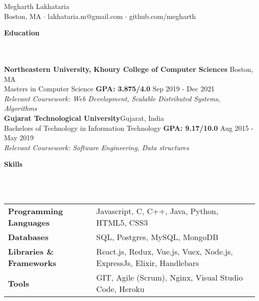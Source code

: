 \documentclass[]{article}
\newcommand{\lineunder} {
    \vspace*{-8pt} \\
    \hrulefill \\
}
\newcommand{\header} [1] {
    {\vspace*{6pt} \fontsize{12}{12}\selectfont \textbf{#1}}
     \lineunder
}
\begin{document}
\vspace*{-40pt}

    

\begin{center}
	{\LARGE {Megharth Lakhataria}}\\
	Boston, MA $\cdot$ lakhataria.m@gmail.com $\cdot$ github.com/megharth\\
\end{center}

\header{Education}
\hspace{1mm}
\textbf{Northeastern University, Khoury College of Computer Sciences}
\hfill
Boston, MA\\
\hspace{1mm}
Masters in Computer Science \textbf{GPA: 3.875/4.0} \hfill Sep 2019 - Dec 2021\\
\hspace{1mm}
\textit{Relevant Coursework: Web Development, Scalable Distributed Systems, Algorithms}\\
\vspace{1mm}
\hspace{1mm}
\textbf{Gujarat Technological University}\hfill Gujarat, India\\
\hspace{1mm}
Bachelors of Technology in Information Technology \textbf{GPA: 9.17/10.0}  \hfill Aug 2015 - May 2019 \\
\hspace{1mm}
\textit{Relevant Coursework: Software Engineering, Data structures} \\
\vspace{1mm}


\header{Skills}
\vspace{1mm}
\begin{tabular}{ l l }
	\textbf{Programming Languages} & Javascript, C, C++, Java, Python, HTML5, CSS3            \\
	\textbf{Databases}             & SQL, Postgres, MySQL, MongoDB                            \\
    
    \textbf{Libraries \& Frameworks} & React.js, Redux, Vue.js, Vuex, Node.js, ExpressJs, Elixir, Handlebars \\
    
    \textbf{Tools}                & GIT, Agile (Scrum), Nginx, Visual Studio Code, Heroku \\          
\end{tabular}
\end{document}
